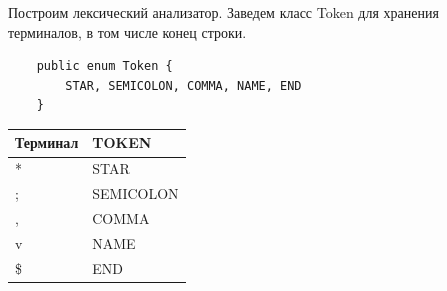 \documentclass[10pt,a4paper,oneside]{article}
\begin{document}
  \noindent
  Построим лексический анализатор. Заведем класс Token для хранения терминалов, в том числе конец строки.\\
  \begin{verbatim}
    public enum Token {
        STAR, SEMICOLON, COMMA, NAME, END
    }
  \end{verbatim}
  
   \begin{center}
      \begin{tabular}{ | l | l | }
      \hline
      Терминал & TOKEN \\ \hline
      * & STAR \\ \hline
      ; & SEMICOLON \\ \hline
      , & COMMA \\ \hline
      v & NAME \\ \hline
      \$ & END \\ \hline
      \end{tabular}
  \end{center}
  
\end{document}
